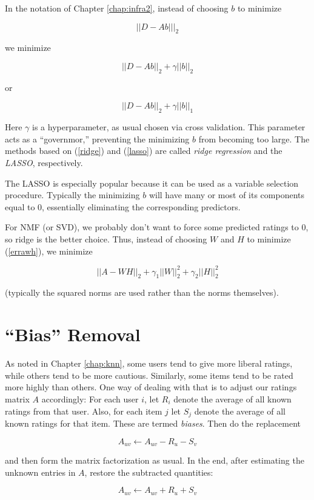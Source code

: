 In the notation of Chapter \ref{chap:infra2}, instead of choosing $b$ to
minimize

\begin{equation}
||D - Ab|||_2
\end{equation}

we minimize

\begin{equation}
\label{ridge}
||D - Ab||_2 + \gamma ||b||_2
\end{equation}

or

\begin{equation}
\label{lasso}
||D - Ab||_2 + \gamma ||b||_1
\end{equation}

Here $\gamma$ is a hyperparameter, as usual chosen via cross validation.
This parameter acts as a ``governmor,'' preventing the minimizing $b$
from becoming too large.  The methods based on (\ref{ridge}) and
(\ref{lasso}) are called \textit{ridge regression} and the
\textit{LASSO}, respectively.

The LASSO is especially popular because it can be used as a variable
selection procedure.  Typically the minimizing $b$ will have many or
most of its components equal to 0, essentially eliminating the
corresponding predictors.

For NMF (or SVD), we probably don't want to force some predicted ratings
to 0, so ridge is the better choice.  Thus, instead of choosing $W$ and
$H$ to minimize (\ref{errawh}), we minimize

\begin{equation}
||A - WH||_2 + \gamma_1 ||W||_2^2 + \gamma_2 ||H||_2^2
\end{equation}

(typically the squared norms are used rather than the norms themselves).

\section{``Bias'' Removal}

As noted in Chapter \ref{chap:knn}, some users tend to give more liberal
ratings, while others tend to be more cautious.  Similarly, some items
tend to be rated more highly than others.  One way of dealing with
that is to adjust our ratings matrix $A$ accordingly:  For each user
$i$, let $R_i$ denote the average of all known ratings from that user.
Also, for each item $j$ let $S_j$ denote the average of all known ratings
for that item.  These are termed \textit{biases}. Then do the replacement

\begin{equation}
A_{uv} \leftarrow A_{uv} - R_u - S_v
\end{equation}

and then form the matrix factorization as usual.  In the end, after
estimating the unknown entries in $A$, restore
the subtracted quantities:

\begin{equation}
A_{uv} \leftarrow A_{uv} + R_u + S_v
\end{equation}
